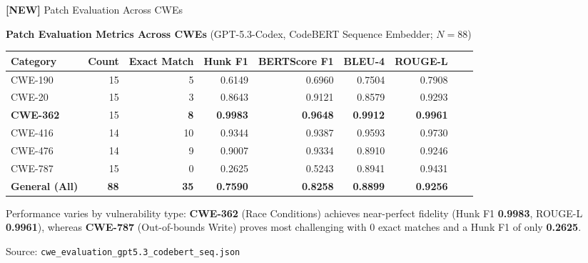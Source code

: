 \documentclass[aspectratio=169,10pt]{beamer}
\begin{document}
\begin{frame}{\textbf{[NEW]} Patch Evaluation Across CWEs}

  \begin{center}
    {\small\textbf{Patch Evaluation Metrics Across CWEs} {\scriptsize(GPT-5.3-Codex, CodeBERT Sequence Embedder; $N=88$)}}\\[4pt]
    {\scriptsize
    \renewcommand{\arraystretch}{1.15}
    \setlength{\tabcolsep}{3pt}
    \begin{tabular}{lrrrrrrrr}
      \toprule
      \textbf{Category} & \textbf{Count} & \textbf{Exact Match} & \textbf{Hunk F1} & \textbf{BERTScore F1} & \textbf{BLEU-4} & \textbf{ROUGE-L} \\
      \midrule
      CWE-190 & 15 & 5 & 0.6149 & 0.6960 &  0.7504 & 0.7908 \\
      CWE-20  & 15 & 3 & 0.8643 & 0.9121 & 0.8579 & 0.9293 \\
      \rowcolor{hit!12}
      \textbf{CWE-362} & 15 & \textbf{8} & \textbf{0.9983} & \textbf{0.9648} & \textbf{0.9912} & \textbf{0.9961} \\
      CWE-416 & 14 & 10 & 0.9344 & 0.9387 & 0.9593 & 0.9730 \\
      CWE-476 & 14 & 9 & 0.9007 & 0.9334 & 0.8910 & 0.9246 \\
      \rowcolor{miss!15}
      CWE-787 & 15 & 0 & 0.2625 & 0.5243 & 0.8941 & 0.9431 \\
      \midrule
      \textbf{General (All)} & \textbf{88} & \textbf{35} & \textbf{0.7590} & \textbf{0.8258} & \textbf{0.8899} & \textbf{0.9256} \\
      \bottomrule
    \end{tabular}}
  \end{center}

  \vspace{0.35em}
  \begin{tcolorbox}[colback=hit!5, colframe=hit!70!black, boxrule=0.35pt,
    left=3pt, right=3pt, top=2pt, bottom=1pt, arc=2pt, width=\linewidth]
    \scriptsize
    Performance varies by vulnerability type: \textbf{CWE-362} (Race Conditions) achieves near-perfect fidelity (Hunk F1 \textbf{0.9983}, ROUGE-L \textbf{0.9961}), whereas \textbf{CWE-787} (Out-of-bounds Write) proves most challenging with 0 exact matches and a Hunk F1 of only \textcolor{miss}{\textbf{0.2625}}.
  \end{tcolorbox}

  \vspace{0.2em}
  {\scriptsize\textcolor{notecol}{Source: \texttt{cwe\_evaluation\_gpt5.3\_codebert\_seq.json}}}

\end{frame}
\end{document}
